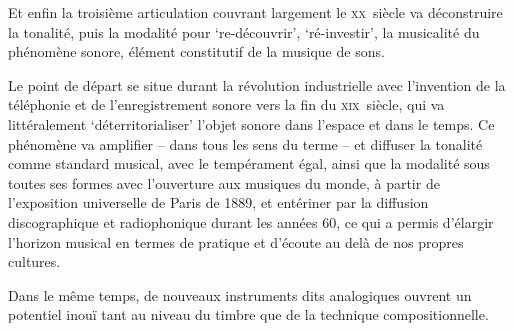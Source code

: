 \documentclass{article}
\begin{document}
Et enfin la troisième articulation couvrant largement le \textsc{xx}\ieme ~siècle va déconstruire %
la tonalité, puis la modalité pour `re-découvrir', `ré-investir', la musicalité du phénomène sonore, élément constitutif de la musique de sons. 

Le point de départ se situe durant la révolution industrielle avec l'invention de la téléphonie et de l'enregistrement sonore vers la fin du \textsc{xix}\ieme ~siècle, qui va littéralement `déterritorialiser' %
 l'objet sonore dans l'espace et dans le temps. Ce phénomène va amplifier -- dans tous les sens du terme -- et %
 diffuser la tonalité comme standard musical, avec le tempérament égal, ainsi que la modalité sous toutes ses formes avec l’ouverture aux musiques du monde, %
 à partir de l’exposition universelle de Paris de 1889, et entériner par la diffusion discographique et radiophonique durant les années 60, ce qui a permis d’élargir l’horizon musical en termes de pratique et d’écoute au delà de nos propres cultures.%

Dans le même temps, de nouveaux instruments dits analogiques ouvrent un potentiel inouï tant au niveau du timbre que de la technique compositionnelle.
\end{document}
